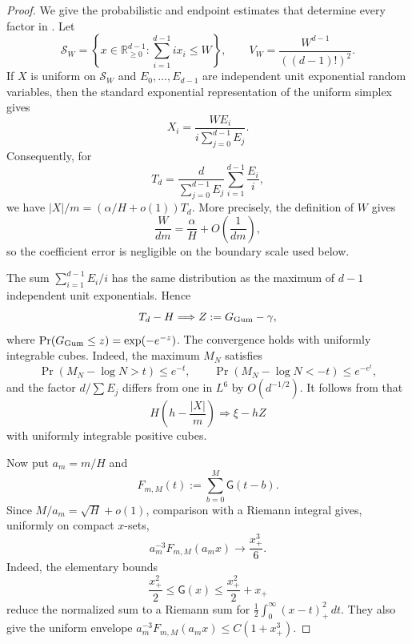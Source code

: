 \documentclass[11pt,letterpaper]{article}
\theoremstyle{definition}
\newcommand{\R}{\mathbb{R}}
\begin{document}
\begin{proof}
We give the probabilistic and endpoint estimates that determine every
factor in . Let
\[
  \mathcal S_W=
  \left\{x\in\R_{\ge0}^{d-1}:
  \sum_{i=1}^{d-1}ix_i\le W\right\},
  \qquad
  V_W=\frac{W^{d-1}}{((d-1)!)^2}.
\]
If $X$ is uniform on $\mathcal S_W$ and
$E_0,\ldots,E_{d-1}$ are independent unit exponential random variables,
then the standard exponential representation of the uniform simplex gives
\begin{equation}
  X_i=\frac{WE_i}{i\sum_{j=0}^{d-1}E_j}.
  \label{eq:boundary-exponential-representation}
\end{equation}
Consequently, for
\[
  T_d=
  \frac d{\sum_{j=0}^{d-1}E_j}
  \sum_{i=1}^{d-1}\frac{E_i}{i},
\]
we have $|X|/m=(\alpha/H+o(1))T_d$.
More precisely, the definition of $W$ gives
\[
  \frac{W}{dm}=\frac\alpha H+O\left(\frac1{dm}\right),
\]
so the coefficient error is negligible on the boundary scale used below.

The sum $\sum_{i=1}^{d-1}E_i/i$ has the same distribution as the maximum
of $d-1$ independent unit exponentials. Hence
\begin{equation}
  T_d-H\Longrightarrow Z:=G_{\rm Gum}-\gamma,
  \label{eq:boundary-gumbel-limit}
\end{equation}
where $\Pr(G_{\rm Gum}\le z)=\exp(-e^{-z})$. The convergence holds with
uniformly integrable cubes. Indeed, the maximum $M_N$ satisfies
\[
  \Pr(M_N-\log N>t)\le e^{-t},
  \qquad
  \Pr(M_N-\log N<-t)\le e^{-e^t},
\]
and the factor $d/\sum E_j$ differs from one in $L^6$ by $O(d^{-1/2})$.
It follows from  that
\begin{equation}
  H\left(h-\frac{|X|}{m}\right)
  \Longrightarrow \xi-hZ
  \label{eq:boundary-slack-limit}
\end{equation}
with uniformly integrable positive cubes.

Now put $a_m=m/H$ and
\[
  F_{m,M}(t):=\sum_{b=0}^{M}\mathsf G(t-b).
\]
Since $M/a_m=\sqrt H+o(1)$, comparison with a Riemann integral gives,
uniformly on compact $x$-sets,
\begin{equation}
  a_m^{-3}F_{m,M}(a_mx)
  \longrightarrow\frac{x_+^3}{6}.
  \label{eq:boundary-cubic-riemann}
\end{equation}
Indeed, the elementary bounds
\[
  \frac{x_+^2}{2}\leq \mathsf G(x)\leq\frac{x_+^2}{2}+x_+
\]
reduce the normalized sum to a Riemann sum for
$\frac12\int_0^\infty(x-t)_+^2\,dt$. They also give the uniform envelope
$a_m^{-3}F_{m,M}(a_mx)\leq C(1+x_+^3)$.


\end{proof}
\end{document}

